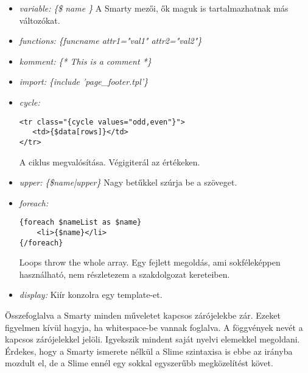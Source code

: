 \begin{itemize}
\item \emph{variable: }
\textit{\{\$ name \}}
A Smarty mezői, ők maguk is tartalmazhatnak más változókat. 
\item \emph{functions: }
\textit{\{funcname attr1="val1" attr2="val2"\}}
\item \emph{komment: } 
\textit{\{* This is a comment *\}}
\item \emph{import: } 
\textit{\{include 'page\_footer.tpl'\}}
\item \emph{cycle: }
\begin{verbatim}
<tr class="{cycle values="odd,even"}">
   <td>{$data[rows]}</td>
</tr>
\end{verbatim}
A ciklus megvalósítása. 
Végigiterál az értékeken.
\item \emph{upper: } 
\textit{\{\$name|upper\}}
Nagy betűkkel szúrja be a szöveget.
\item \emph{foreach: } 
\begin{verbatim}
{foreach $nameList as $name}
    <li>{$name}</li>
{/foreach}
\end{verbatim}
Loops throw the whole array.
Egy fejlett megoldás, ami sokféleképpen használható, nem részletezem a szakdolgozat kereteiben.
\item \emph{display: } 
Kiír konzolra egy template-et.
\end{itemize}

Összefoglalva a Smarty minden műveletet kapcsos zárójelekbe zár.
Ezeket figyelmen kívül hagyja, ha whitespace-be vannak foglalva.
A föggvények nevét a kapcsos zárójelekkel jelöli.
Igyekszik mindent saját nyelvi elemekkel megoldani.
Érdekes, hogy a Smarty ismerete nélkül a Slime szintaxisa is ebbe az irányba mozdult el, de a Slime ennél egy sokkal egyszerűbb megközelítést követ.

